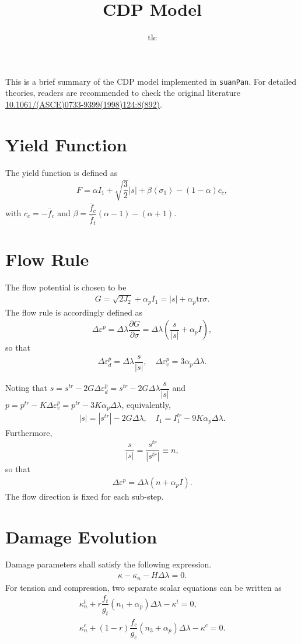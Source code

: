 \documentclass[11pt,fleqn]{article}
\title{CDP Model}\author{tlc}
\newcommand*{\tr}[1]{\mathrm{tr}#1}
\newcommand*{\pfrac}[2]{\dfrac{\partial#1}{\partial#2}}
\begin{document}
\maketitle
This is a brief summary of the CDP model implemented in \texttt{suanPan}. For detailed theories, readers are recommended to check the original literature \href{https://doi.org/10.1061/(ASCE)0733-9399(1998)124:8(892)}{10.1061/(ASCE)0733-9399(1998)124:8(892)}.
\section{Yield Function}
The yield function is defined as
\begin{gather}
F=\alpha{}I_1+\sqrt{\dfrac{3}{2}}|s|+\beta\left<\sigma_1\right>-\left(1-\alpha\right)c_c,
\end{gather}
with $c_c=-\bar{f}_c$ and $\beta=\dfrac{\bar{f}_c}{\bar{f}_t}(\alpha-1)-(\alpha+1)$.
\section{Flow Rule}
The flow potential is chosen to be
\begin{gather}
G=\sqrt{2J_2}+\alpha_pI_1=|s|+\alpha_p\tr{\sigma}.
\end{gather}
The flow rule is accordingly defined as
\begin{gather}
\Delta\varepsilon^p=\Delta\lambda\pfrac{G}{\sigma}=\Delta\lambda\left(\dfrac{s}{|s|}+\alpha_pI\right),
\end{gather}
so that
\begin{gather}
\Delta\varepsilon^p_d=\Delta\lambda\dfrac{s}{|s|},\quad\Delta\varepsilon^p_v=3\alpha_p\Delta\lambda.
\end{gather}

Noting that $s=s^{tr}-2G\Delta\varepsilon^p_d=s^{tr}-2G\Delta\lambda\dfrac{s}{|s|}$ and $p=p^{tr}-K\Delta\varepsilon^p_v=p^{tr}-3K\alpha_p\Delta\lambda$, equivalently,
\begin{gather}
|s|=|s^{tr}|-2G\Delta\lambda,\quad{}I_1=I_1^{tr}-9K\alpha_p\Delta\lambda.
\end{gather}
Furthermore,
\begin{gather}
\dfrac{s}{|s|}=\dfrac{s^{tr}}{|s^{tr}|}\equiv{}n,
\end{gather}
so that
\begin{gather}
\Delta\varepsilon^p=\Delta\lambda\left(n+\alpha_pI\right).
\end{gather}
The flow direction is fixed for each sub-step.
\section{Damage Evolution}
Damage parameters shall satisfy the following expression.
\begin{gather}
\kappa-\kappa_n-H\Delta\lambda=0.
\end{gather}
For tension and compression, two separate scalar equations can be written as
\begin{gather}
\kappa^t_n+r\dfrac{f_t}{g_t}(n_1+\alpha_p)\Delta\lambda-\kappa^t=0,\\
\kappa^c_n+(1-r)\dfrac{f_c}{g_c}(n_3+\alpha_p)\Delta\lambda-\kappa^c=0.
\end{gather}
\end{document}
